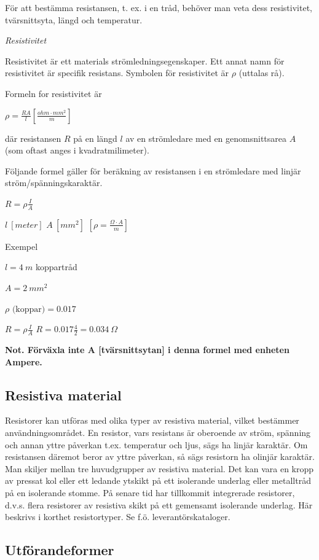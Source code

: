 För att bestämma resistansen, t. ex. i en tråd,
behöver man veta dess resistivitet, tvärsnittsyta, längd och temperatur.

\emph{Resistivitet}

Resistivitet är ett materials strömledningsegenskaper. Ett annat namn för
resistivitet är specifik resistans. Symbolen för resistivitet är \(\rho\)
(uttalas rå).

Formeln for resistivitet är

\(\rho = \frac{R A}{l} \left[\frac{ohm \cdot mm^2}{m}\right]\)

där resistansen \(R\) på en längd \(l\) av en strömledare med en
genomsnittsarea \(A\) (som oftast anges i kvadratmilimeter).

Följande formel gäller för beräkning av resistansen i en strömledare med
linjär ström/spänningskaraktär.

\(R = \rho \frac{I}{A} \)

\(l\ [meter]\) \(A\ [mm^2]\) \(\left[\rho = \frac{\Omega \cdot A}{m} \right]\)

Exempel

\(l = 4\ m\) koppartråd

\(A = 2\ mm^2\)

\(\rho \text{ (koppar)} = 0.017\)

\(R = \rho \frac{I}{A}\) \(R = 0.017 \frac{4}{2} = 0.034\ \Omega\)

\textbf{Not. Förväxla inte A [tvärsnittsytan] i denna formel med enheten Ampere.}

\subsection{Resistiva material}

Resistorer kan utföras med olika typer av resistiva material, vilket bestämmer
användningsområdet. En resistor, vars resistans är oberoende av ström, spänning
och annan yttre påverkan t.ex. temperatur och ljus, sägs ha linjär karaktär.
Om resistansen däremot beror av yttre påverkan, så sägs resistorn ha olinjär
karaktär. Man skiljer mellan tre huvudgrupper av resistiva material. Det kan
vara en kropp av pressat kol eller ett ledande ytskikt på ett isolerande
underlag eller metalltråd på en isolerande stomme. På senare tid har tillkommit
integrerade resistorer, d.v.s. flera resistorer av resistiva skikt på ett
gemensamt isolerande underlag. Här beskrivs i korthet resistortyper.
Se f.ö. leverantörskataloger.

\subsection{Utförandeformer}

